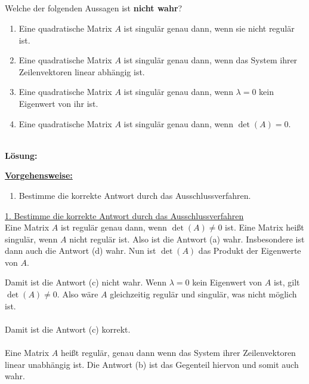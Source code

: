 \subsection*{}
Welche der folgenden Aussagen ist \textbf{nicht wahr}?
\renewcommand{\labelenumi}{(\alph{enumi})}
\begin{enumerate}
	\item 
	Eine quadratische Matrix $ A $ ist singulär genau dann, wenn sie nicht regulär ist.
	\item
	Eine quadratische Matrix $ A $ ist singulär genau dann, wenn das System ihrer Zeilenvektoren linear abhängig ist.
	
	\item
	Eine quadratische Matrix $ A $ ist singulär genau dann, wenn $ \lambda = 0 $ kein Eigenwert von ihr ist.
	
	\item
	Eine quadratische Matrix $ A $ ist singulär genau dann, wenn $\det(A) = 0 $.
\end{enumerate}
\ \\
\textbf{Lösung:}
\begin{mdframed}
	\underline{\textbf{Vorgehensweise:}}
	\renewcommand{\labelenumi}{\theenumi.}
	\begin{enumerate}
		\item Bestimme die korrekte Antwort durch das Ausschlussverfahren. 
	\end{enumerate}
\end{mdframed}

\underline{1. Bestimme die korrekte Antwort durch das Ausschlussverfahren}\\
Eine Matrix $ A $ ist regulär genau dann, wenn $ \det(A) \neq  0 $ ist.
Eine Matrix heißt singulär, wenn $ A $ nicht regulär ist. Also ist die Antwort (a) wahr.
Insbesondere ist dann auch die Antwort (d) wahr.
Nun ist $ \det(A) $ das Produkt der Eigenwerte von $ A $.

Damit ist die Antwort (c) nicht wahr. Wenn $ \lambda = 0 $ kein Eigenwert von $ A $ ist, gilt $ \det(A) \neq 0 $.
Also wäre $ A $ gleichzeitig regulär und singulär, was nicht möglich ist.\\
\\
Damit ist die Antwort (c) korrekt.
\\
\\
Eine Matrix $ A $ heißt regulär, genau dann wenn das System ihrer Zeilenvektoren linear unabhängig ist.
Die Antwort (b) ist das Gegenteil hiervon und somit auch wahr.
\newpage
